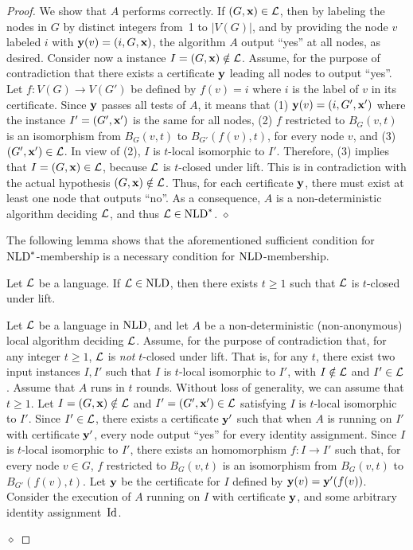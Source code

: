 \documentclass{llncs}
\newenvironment{proofofclaim}{\noindent {\em Proof.}}{\hfill $\diamond$ \medbreak}
\newcommand{\inp}{\mbox{\rm\bf x}}
\newcommand{\certif}{\mbox{\rm\bf y}}
\newcommand{\id}{\mbox{\rm Id}}
\newcommand{\NLD}{\mbox{\rm NLD}}
\def\cL{{\cal L}}
\begin{document}
\begin{proof}
\begin{proofofclaim}
We show that $A$ performs correctly. If $(G,\inp)\in\cL$, then by labeling the nodes in $G$ by distinct integers from~1 to $|V(G)|$, and by providing the node $v$ labeled $i$ with $\certif(v)=(i,G,\inp)$, the algorithm $A$ output ``yes'' at all nodes, as desired. Consider now a instance $I=(G,\inp)\notin\cL$. Assume, for the purpose of contradiction that there exists a certificate $\certif$ leading all nodes to output ``yes''. Let $f:V(G) \to V(G')$ be defined by $f(v)=i$ where $i$ is the label of $v$ in its certificate. Since $\certif$ passes all tests of $A$, it means that (1) $\certif(v)=(i,G',\inp')$ where the instance $I'=(G',\inp')$ is the same for all nodes, (2) $f$ restricted to $B_G(v,t)$ is an isomorphism from  $B_G(v,t)$ to $B_{G'}(f(v),t)$, for every node $v$, and (3)  $(G',\inp')\in\cL$. In view of (2), $I$ is $t$-local isomorphic to $I'$. Therefore, (3) implies that $I=(G,\inp)\in\cL$, because $\cL$ is $t$-closed under lift. This is in contradiction with the actual hypothesis $(G,\inp)\notin\cL$.  Thus, for each certificate $\certif$, there must exist at least one node that outputs ``no''.  As a consequence, $A$ is a non-deterministic algorithm deciding $\cL$, and thus $\cL\in\NLD^*$.
\end{proofofclaim}

The following lemma shows that the aforementioned sufficient condition for $\NLD^*$-membership is a necessary condition for $\NLD$-membership. 

\begin{lemma}\label{claim:necessary} 
Let $\cL$ be a language. If $\cL\in\NLD$, then there exists $t \geq 1$ such that $\cL$ is $t$-closed under lift. 
\end{lemma} 

\begin{proofofclaim}
Let $\cL$ be a language in $\NLD$, and let $A$ be a non-deterministic (non-anonymous) local algorithm deciding $\cL$. Assume, for the purpose of contradiction that, for any integer $t \geq 1$, $\cL$ is \emph{not} $t$-closed under lift. That is, for any $t$, there exist two input instances $I,I'$ such that $I$ is $t$-local isomorphic to $I'$, with $I\notin\cL$ and $I'\in\cL$. Assume that $A$ runs in $t$ rounds. Without loss of generality, we can assume that $t\geq 1$.  Let $I=(G,\inp)\notin\cL$ and $I'=(G',\inp')\in\cL$ satisfying $I$ is $t$-local isomorphic to $I'$. Since $I'\in\cL$, there exists a certificate $\certif'$ such that when $A$ is running on $I'$ with certificate $\certif'$, every node output ``yes'' for every identity assignment. Since  $I$ is $t$-local isomorphic to $I'$, there exists an homomorphism $f:I\to I'$ such that, for every node $v\in G$, $f$ restricted to $B_G(v,t)$ is an isomorphism from  $B_G(v,t)$ to $B_{G'}(f(v),t)$. Let $\certif$ be the certificate for $I$ defined by $\certif(v)=\certif'(f(v))$. Consider the execution of $A$ running on $I$ with certificate $\certif$, and some arbitrary  identity assignment~$\id$. 


\end{proofofclaim}
\end{proof}
\end{document}
